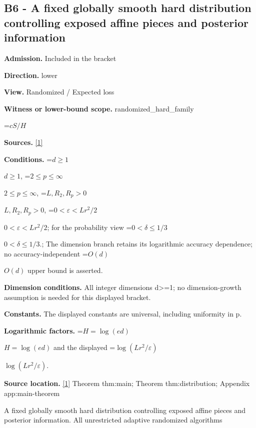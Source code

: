 \documentclass[10pt,a4paper]{article}
\newcommand{\AtlasMath}[1]{\par\begingroup\centering\setbox0=\hbox{$\displaystyle #1$}\ifdim\wd0>1.4\linewidth\typeout{ATLAS WIDE FORMULA: \the\wd0}\fi\ifdim\wd0>\linewidth\resizebox{\linewidth}{!}{\box0}\else\box0\fi\par\endgroup}
\newcommand{\AtlasInlineMath}[1]{\begingroup\setbox0=\hbox{$#1$}\ifdim\wd0>.4\linewidth\endgroup\AtlasMath{#1}\else\endgroup$#1$\fi}
\begin{document}
\subsection{B6 - A fixed globally smooth hard distribution controlling exposed affine pieces and posterior information}


\textbf{Admission.} Included in the bracket



\textbf{Direction.} lower



\textbf{View.} Randomized / Expected loss



\textbf{Witness or lower-bound scope.} randomized\_hard\_family



\AtlasMath{cS/H}


\textbf{Sources.} \href{https://github.com/WU-Wendao/Colombo/blob/main/colombo_sensorium/Complexity_altas/data/sources/colombo/U02/manuscript.pdf}{[1]}



\textbf{Conditions.} \AtlasInlineMath{d\ge1}, \AtlasInlineMath{2\le p\le\infty}, \AtlasInlineMath{L,R_2,R_p>0}, \AtlasInlineMath{0<\varepsilon<Lr^2/2}; for the probability view \AtlasInlineMath{0<\delta\le1/3}.; The dimension branch retains its logarithmic accuracy dependence; no accuracy-independent \AtlasInlineMath{O(d)} upper bound is asserted.



\textbf{Dimension conditions.} All integer dimensions d>=1; no dimension-growth assumption is needed for this displayed bracket.



\textbf{Constants.} The displayed constants are universal, including uniformity in p.



\textbf{Logarithmic factors.} \AtlasInlineMath{H=\log(ed)} and the displayed \AtlasInlineMath{\log(Lr^2/\varepsilon)}.



\textbf{Source location.} \href{https://github.com/WU-Wendao/Colombo/blob/main/colombo_sensorium/Complexity_altas/data/sources/colombo/U02/manuscript.pdf}{[1]} Theorem thm:main; Theorem thm:distribution; Appendix app:main-theorem



A fixed globally smooth hard distribution controlling exposed affine pieces and posterior information. All unrestricted adaptive randomized algorithms
\end{document}
